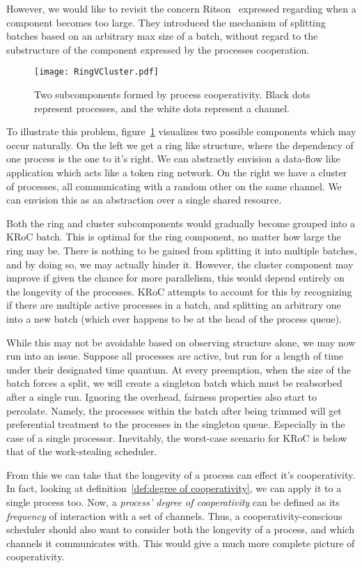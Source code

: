 However, we would like to revisit the concern Ritson \etal~expressed regarding 
when a component becomes too large. They introduced the mechanism of splitting
batches based on an arbitrary max size of a batch, without regard to the 
substructure of the component expressed by the processes cooperation.

\begin{figure} 
\centering
\texttt{[image: RingVCluster.pdf]}
\caption{Two subcomponents formed by process cooperativity. Black dots 
represent processes, and the white dots represent a channel.}
\label{fig:RingVCluster}
\end{figure}

To illustrate this problem, figure~\ref{fig:RingVCluster} visualizes two 
possible components which may occur naturally. On the left we get a ring like
structure, where the dependency of one process is the one to it's right.
We can abstractly envision a data-flow like application which acts like
a token ring network. On the right we have a cluster of processes, all 
communicating with a random other on the same channel. We can envision this
as an abstraction over a single shared resource.

Both the ring and cluster subcomponents would gradually become grouped into a 
KRoC batch. This is optimal for the ring component, no matter how large the 
ring may be. There is nothing to be gained from splitting it into multiple 
batches, and by doing so, we may actually hinder it. However, the cluster 
component may improve if given the chance for more parallelism, this would
depend entirely on the longevity of the processes.
KRoC attempts to account for this by recognizing if there are multiple active
processes in a batch, and splitting an arbitrary one into a new batch (which
ever happens to be at the head of the process queue). 

While this may not be avoidable based on observing structure alone, we may now 
run into an issue. Suppose all processes are active, but run for a length of time under their
designated time quantum. At every preemption, when the size of the batch forces 
a split, we will create a singleton batch which must be reabsorbed after a 
single run. Ignoring the overhead, fairness properties also start to percolate.
Namely, the processes within the batch after being trimmed will get preferential
treatment to the processes in the singleton queue. Especially in the case of 
a single processor. Inevitably, the worst-case scenario for KRoC is below that
of the work-stealing scheduler.

From this we can take that the longevity of a process can effect it's 
cooperativity. In fact, looking at 
definition~\ref{def:degree of cooperativity}, we can apply it to a single 
process too. Now, a \emph{process' degree of cooperativity} can be defined as 
its \emph{frequency} of interaction with a set of channels.
Thus, a cooperativity-conscious scheduler should also want to consider both
the longevity of a process, and which channels it communicates with. This would
give a much more complete picture of cooperativity.

